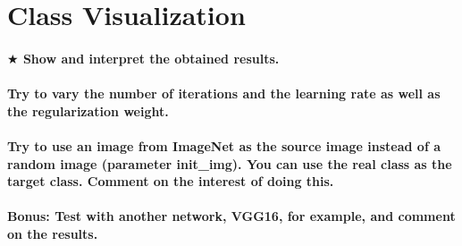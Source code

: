 \section{Class Visualization}
\paragraph*{$ \bigstar $ Show and interpret the obtained results.}
\paragraph*{Try to vary the number of iterations and the learning rate as well as the regularization weight.}
\paragraph*{Try to use an image from ImageNet as the source image instead of a random image (parameter init\_img). You can use the real class as the target class. Comment on the interest of doing this.}
\paragraph*{\textbf{Bonus:} Test with another network, VGG16, for example, and comment on the results.}